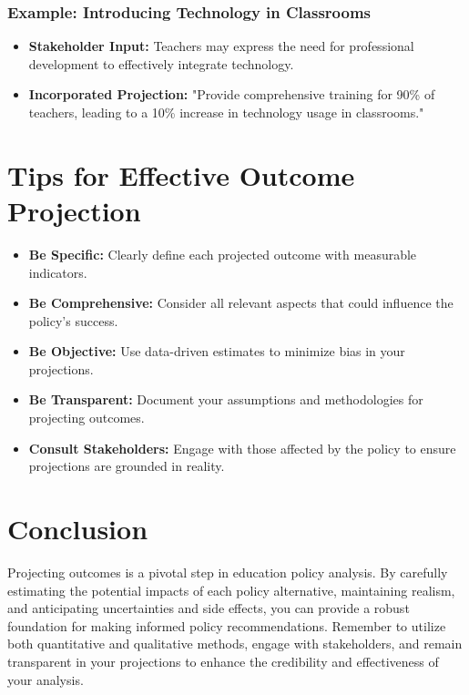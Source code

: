 \documentclass{article}
\theoremstyle{definition}
\theoremstyle{plain}
\begin{document}
\subsubsection{Example: Introducing Technology in Classrooms}

\begin{itemize}
    \item \textbf{Stakeholder Input:} Teachers may express the need for professional development to effectively integrate technology.
    \item \textbf{Incorporated Projection:} "Provide comprehensive training for 90\% of teachers, leading to a 10\% increase in technology usage in classrooms."
\end{itemize}

\section{Tips for Effective Outcome Projection}

\begin{itemize}
    \item \textbf{Be Specific:} Clearly define each projected outcome with measurable indicators.
    \item \textbf{Be Comprehensive:} Consider all relevant aspects that could influence the policy's success.
    \item \textbf{Be Objective:} Use data-driven estimates to minimize bias in your projections.
    \item \textbf{Be Transparent:} Document your assumptions and methodologies for projecting outcomes.
    \item \textbf{Consult Stakeholders:} Engage with those affected by the policy to ensure projections are grounded in reality.
\end{itemize}

\section{Conclusion}

Projecting outcomes is a pivotal step in education policy analysis. By carefully estimating the potential impacts of each policy alternative, maintaining realism, and anticipating uncertainties and side effects, you can provide a robust foundation for making informed policy recommendations. Remember to utilize both quantitative and qualitative methods, engage with stakeholders, and remain transparent in your projections to enhance the credibility and effectiveness of your analysis.
\end{document}
